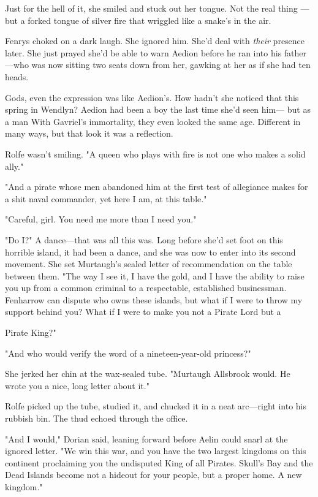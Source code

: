 Just for the hell of it, she smiled and stuck out her tongue. Not the real thing ---but a forked tongue of silver fire that wriggled like a snake's in the air.

Fenrys choked on a dark laugh. She ignored him. She'd deal with
\emph{their} presence later. She just prayed she'd be able to warn Aedion before he ran into his father---who was now sitting two seats down from her, gawking at her as if she had ten heads.

Gods, even the expression was like Aedion's. How hadn't she noticed that this spring in Wendlyn? Aedion had been a boy the last time she'd seen him--- but as a man  With Gavriel's immortality, they even looked the same age. Different in many ways, but that look  it was a reflection.

Rolfe wasn't smiling. "A queen who plays with fire is not one who makes a solid ally."

"And a pirate whose men abandoned him at the first test of allegiance makes for a shit naval commander, yet here I am, at this table."

"Careful, girl. You need me more than I need you."

"Do I?" A dance---that was all this was. Long before she'd set foot on this horrible island, it had been a dance, and she was now to enter into its second movement. She set Murtaugh's sealed letter of recommendation on the table between them. "The way I see it, I have the gold, and I have the ability to raise you up from a common criminal to a respectable, established businessman. Fenharrow can dispute who owns these islands, but  what if I were to throw my support behind you? What if I were to make you not a Pirate Lord but a

Pirate King?"

"And who would verify the word of a nineteen-year-old princess?"

She jerked her chin at the wax-sealed tube. "Murtaugh Allsbrook would. He wrote you a nice, long letter about it."

Rolfe picked up the tube, studied it, and chucked it in a neat arc---right into his rubbish bin. The thud echoed through the office.

"And I would," Dorian said, leaning forward before Aelin could snarl at the ignored letter. "We win this war, and you have the two largest kingdoms on this continent proclaiming you the undisputed King of all Pirates. Skull's Bay and the Dead Islands become not a hideout for your people, but a proper home. A new kingdom."

